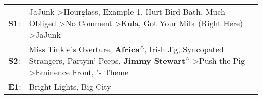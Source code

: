 \begin{supertabular}{p{0.03\textwidth}p{0.92\textwidth}}
 \textbf{S1}:  &                                    JaJunk\textsuperscript{} \textgreater \enspace Hourglass\textsuperscript{}, \enspace Example 1\textsuperscript{}, \enspace Hurt Bird Bath\textsuperscript{}, \enspace Much Obliged\textsuperscript{} \textgreater \enspace No Comment\textsuperscript{} \textgreater \enspace Kula\textsuperscript{}, \enspace Got Your Milk (Right Here)\textsuperscript{} \textgreater \enspace JaJunk\textsuperscript{}  \enspace  \\
 \textbf{S2}:  &  Miss Tinkle's Overture\textsuperscript{}, \enspace \textbf{Africa\textsuperscript{$\wedge$}}, \enspace Irish Jig\textsuperscript{}, \enspace Syncopated Strangers\textsuperscript{}, \enspace Partyin' Peeps\textsuperscript{}, \enspace \textbf{Jimmy Stewart\textsuperscript{$\wedge$}} \textgreater \enspace Push the Pig\textsuperscript{} \textgreater \enspace Eminence Front\textsuperscript{}, 's Theme\textsuperscript{}  \enspace  \\
 \textbf{E1}:  &                                                                                                                                                                                                                                                                                                                                                                                                     Bright Lights, Big City\textsuperscript{}  \enspace  \\
\end{supertabular}
